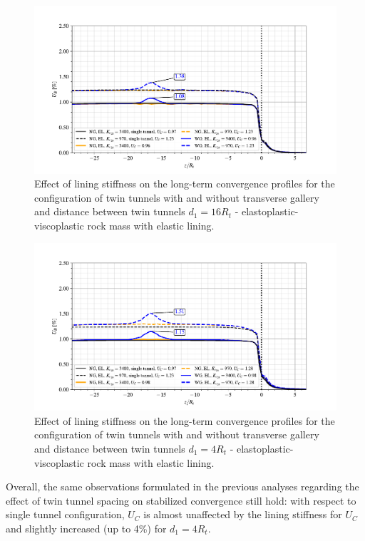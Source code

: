 \documentclass[a4paper,fleqn]{cas-sc}
\begin{document}
\begin{figure}[h!]
	\centering
	\includegraphics[scale=0.9]{Convergence Profiles - EPVP_EL_VEL_d1_16Ri_anotate.pdf}
	\caption{Effect of lining stiffness on the long-term convergence profiles for the configuration of twin tunnels with and without transverse gallery and distance between twin tunnels $d_1=16R_t$ - elastoplastic-viscoplastic rock mass with elastic lining.}
	\label{EPVP_EL_VEL_d1_16Ri}
\end{figure}
\FloatBarrier
\begin{figure}[h!]
	\centering
	\includegraphics[scale=0.9]{Convergence Profiles - EPVP_EL_VEL_d1_4Ri_anotate.pdf}
	\caption{Effect of lining stiffness on the long-term convergence profiles for the configuration of twin tunnels with and without transverse gallery and distance between twin tunnels $d_1=4R_t$ - elastoplastic-viscoplastic rock mass with elastic lining.}
	\label{EPVP_EL_VEL_d1_4Ri}
\end{figure}
\FloatBarrier

Overall, the same observations formulated in the previous analyses regarding the effect of twin tunnel spacing on stabilized convergence still hold: with respect to single tunnel configuration, $U_C$ is almost unaffected by the lining stiffness for $U_C$  and slightly increased (up to 4\%) for $d_1=4R_t$.
\end{document}
